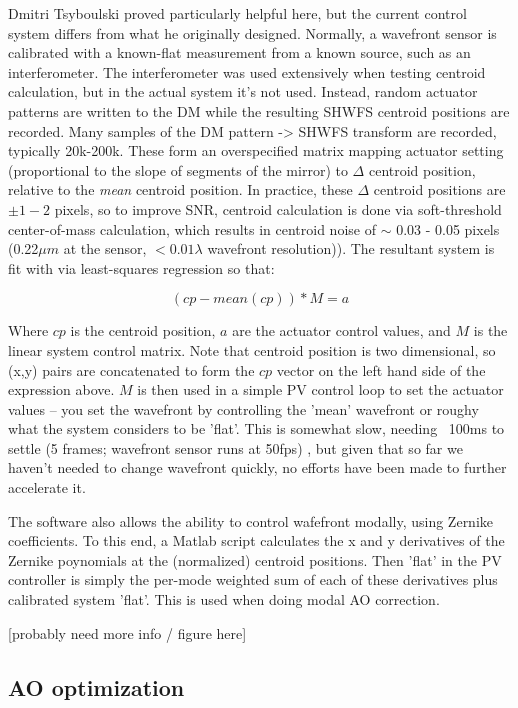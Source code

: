 \documentclass[a4paper,10pt]{article}
\begin{document}
Dmitri Tsyboulski proved particularly helpful here, but the current control system differs from what he originally designed.  Normally, a wavefront sensor is calibrated with a known-flat measurement from a known source, such as an interferometer.  The interferometer was used extensively when testing centroid calculation, but in the actual system it's not used.  Instead, random actuator patterns are written to the DM while the resulting SHWFS centroid positions are recorded.  Many samples of the DM pattern -> SHWFS transform are recorded, typically 20k-200k.  These form an overspecified matrix mapping actuator setting (proportional to the slope of segments of the mirror) to $\Delta$ centroid position, relative to the \textit{mean} centroid position.  In practice, these $\Delta$ centroid positions are $\pm 1-2$ pixels, so to improve SNR, centroid calculation is done via soft-threshold center-of-mass calculation, which results in centroid noise of $\sim$ 0.03 - 0.05 pixels (0.22$\mu m$ at the sensor, $< 0.01 \lambda $ wavefront resolution)).  The resultant system is fit with via least-squares regression so that: 

$$ (cp - mean(cp)) * M = a $$

Where $cp$ is the centroid position, $a$ are the actuator control values, and $M$ is the linear system control matrix.  Note that centroid position is two dimensional, so (x,y) pairs are concatenated to form the $cp$ vector on the left hand side of the expression above. $M$ is then used in a simple PV control loop to set the actuator values -- you set the wavefront by controlling the 'mean' wavefront or roughy what the system considers to be 'flat'.  This is somewhat slow, needing ~100ms to settle (5 frames; wavefront sensor runs at 50fps) , but given that so far we haven't needed to change wavefront quickly, no efforts have been made to further accelerate it.  

The software also allows the ability to control wafefront modally, using Zernike coefficients.   To this end,   a Matlab script calculates the x and y derivatives of the Zernike poynomials at the (normalized) centroid positions.  Then 'flat' in the PV controller is simply the per-mode weighted sum of each of these derivatives plus calibrated system 'flat'.  This is used when doing modal AO correction.  

[probably need more info / figure here] 

\subsection {AO optimization}
\end{document}
